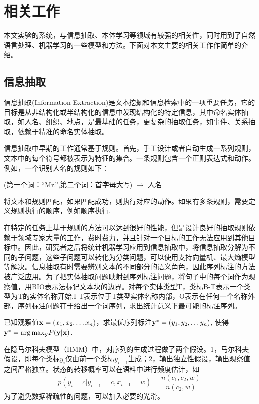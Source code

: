 \chapter{相关工作}
本文实验的系统，与信息抽取、本体学习等领域有较强的相关性，同时用到了自然语言处理、机器学习的一些模型和方法。下面对本文主要的相关工作作简单的介绍。
\section{信息抽取}

信息抽取(Information Extraction)是文本挖掘和信息检索中的一项重要任务，它的目标是从非结构化或半结构化的信息中发现结构化的特定信息，其中命名实体抽取，如人名、组织、地点，是最基础的任务，更复杂的抽取任务，如事件、关系抽取，依赖于精准的命名实体抽取。

信息抽取中早期的工作通常基于规则\cite{ciravegna2001adaptive}。首先，手工设计或者自动生成一系列规则，文本中的每个符号都被表示为特征的集合。一条规则包含一个正则表达式和动作。例如，一个识别人名的规则如下：
\begin{center}
	(第一个词：``Mr.'',第二个词：首字母大写) $\rightarrow$ 人名
\end{center}
将文本和规则匹配，如果匹配成功，则执行对应的动作。如果有多条规则，需要定义规则执行的顺序，例如顺序执行.

在特定的任务上基于规则的方法可以达到很好的性能，但是设计良好的抽取规则依赖于领域专家大量的工作，费时费力，并且针对一个目标的工作无法应用到其他目标中。因此，研究者之后将统计机器学习应用到信息抽取中，将信息抽取分解为不同的子问题，这些子问题可以转化为分类问题，可以使用支持向量机、最大熵模型等解决。信息抽取有时需要辨别文本的不同部分的语义角色，因此序列标注的方法被广泛应用。为了把实体抽取问题映射到序列标注问题，将句子中的每个词作为观察值，用BIO表示法标记文本块的边界。对每个实体类型T，类标B-T表示一个类型为T的实体名称开始,I-T表示位于T类型实体名称内部，O表示在任何一个名称外部，序列标注问题在于给出一个词序列，求出统计意义下最可能的标注序列。

\begin{problem}[序列标注]
已知观察值${\bf{x}} = ({x_1},{x_2}, \ldots {x_n})$，求最优序列标注${\bf{y^*}} = ({y_1},{y_2}, \ldots {y_n})$, 使得${{\bf{y}}^*} = \arg {\max _{\bf{y}}}P({\bf{y}}|{\bf{x}})$.
\end{problem}
在隐马尔科夫模型（HMM）中，对序列的生成过程做了两个假设。1，马尔科夫假设，即每个类标$y_i$仅由前一个类标$y_{i-1}$生成；2，输出独立性假设，输出观察值之间严格独立。状态的转移概率可以在语料中进行频度估计，如
\[
p(y_i=c|y_{i-1} = c, x_{i-1}=w) = \frac{n(c_1, c_2, w)}{n(c_2, w)}
\]
为了避免数据稀疏性的问题，可以加入必要的光滑。

